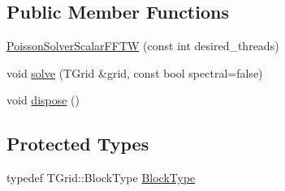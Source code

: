 \subsection*{Public Member Functions}
\begin{DoxyCompactItemize}
\item 
\hyperlink{class_poisson_solver_scalar_f_f_t_w_ad30e877f71d90ed725b4f6dc073d15b1}{Poisson\+Solver\+Scalar\+F\+F\+T\+W} (const int desired\+\_\+threads)
\item 
void \hyperlink{class_poisson_solver_scalar_f_f_t_w_a888b94b2f63f4c95c70da076b30fb31c}{solve} (T\+Grid \&grid, const bool spectral=false)
\item 
void \hyperlink{class_poisson_solver_scalar_f_f_t_w_abf3881339c3ce8a3c25a7d609df542d2}{dispose} ()
\end{DoxyCompactItemize}
\subsection*{Protected Types}
\begin{DoxyCompactItemize}
\item 
typedef T\+Grid\+::\+Block\+Type \hyperlink{class_poisson_solver_scalar_f_f_t_w_ad496c7981a6167c70ccd329d4b37888d}{Block\+Type}
\end{DoxyCompactItemize}
